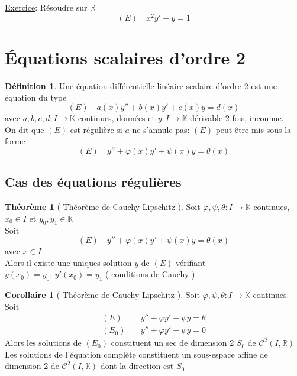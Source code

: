 \documentclass[10pt,a4paper]{article}
\theoremstyle{definition}
\newtheorem{theorem}[proposition]{Théorème}
\newtheorem{corollary}[proposition]{Corollaire}
\newtheorem{definition}[proposition]{Définition}
\begin{document}
\noindent \uline{Exercice}: Résoudre sur \(\mathbb{R}\) \[(E) \quad x^2 y' + y = 1\]

\section{Équations scalaires d'ordre 2}
\begin{definition}
    Une équation différentielle linéaire scalaire d'ordre 2 est une équation du type
    \[(E) \quad a(x)y'' + b(x)y' + c(x)y = d(x)\]
    avec \(a, b, c, d: I \to \mathbb{K}\) continues, données et \(y: I \to \mathbb{K}\) dérivable 2 fois, inconnue. \\
    On dit que \((E)\) est régulière si \(a\) ne s'annule pas: \((E)\) peut être mis sous la forme
    \[(E) \quad y'' + \varphi(x)y' + \psi(x)y = \theta(x)\]
\end{definition}

\subsection{Cas des équations régulières}
\begin{theorem}[ Théorème de Cauchy-Lipschitz ]
    Soit \(\varphi, \psi, \theta: I \to \mathbb{K}\) continues, \(x_0 \in I\) et \(y_0, y_1 \in \mathbb{K}\) \\
    Soit \[(E) \quad y'' + \varphi(x)y' + \psi(x)y = \theta(x)\]
    avec \(x \in I\) \\
    Alors il existe une uniques solution \(y\) de \((E)\) vérifiant \(y(x_0) = y_0,\, y'(x_0) = y_1\) ( conditions de Cauchy )
\end{theorem}
\begin{corollary}[ Théorème de Cauchy-Lipschitz ]
    Soit \(\varphi, \psi, \theta: I \to \mathbb{K}\) continues. \\
    Soit \begin{align*}
        (E)& \quad y'' + \varphi y' + \psi y = \theta \\
        (E_0)& \quad y'' + \varphi y' + \psi y = 0
    \end{align*}
    Alors les solutions de \((E_0)\) constituent un sec de dimension 2 \(S_0\) de \(\mathcal{C}^2(I, \mathbb{R})\) \\
    Les solutions de l'équation complète constituent un sous-espace affine de dimension 2 de \(\mathcal{C}^2(I, \mathbb{K})\) dont la direction est \(S_0\)
\end{corollary}
\end{document}
